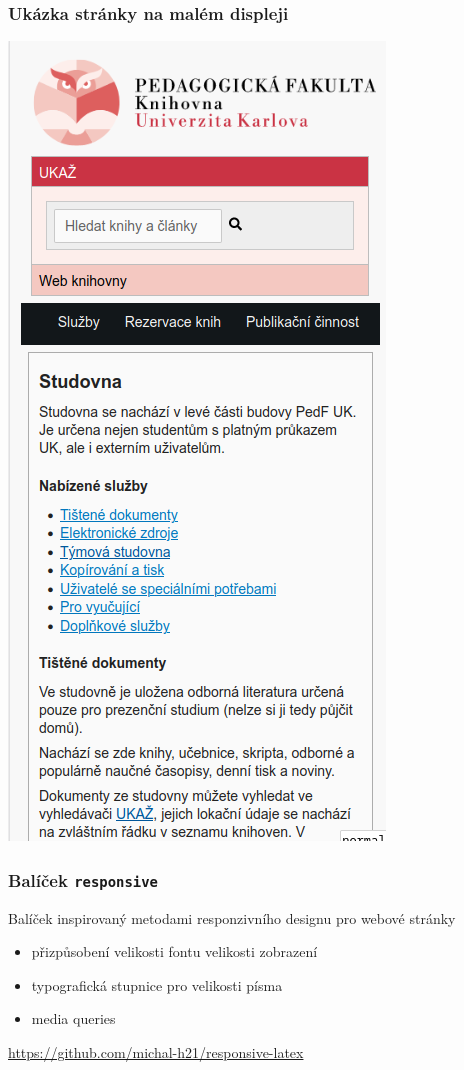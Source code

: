 \begin{frame}
  \frametitle{Ukázka stránky na malém displeji}
  \begin{center}
    \includegraphics[height=.9\textheight]{img/pedf-web-small.png}
  \end{center}
\end{frame}


\begin{frame}
  \frametitle{Balíček \texttt{responsive}}

  Balíček inspirovaný metodami responzivního designu pro webové stránky
  \begin{itemize}
  \item přizpůsobení velikosti fontu velikosti zobrazení
  \item typografická stupnice pro velikosti písma
  \item media queries
\end{itemize}
  \url{https://github.com/michal-h21/responsive-latex}
\end{frame}


